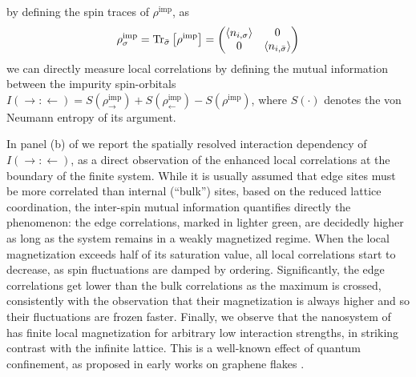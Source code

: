 \documentclass[edipack_sp.tex]{subfiles}
\begin{document}
by defining the spin traces of $\rho^\mathrm{imp}$, as
\begin{equation}
    \rho^\mathrm{imp}_\sigma = 
    {\rm Tr}_{\bar{\sigma}} \left[\rho^\mathrm{imp}\right] =
    \begin{pmatrix}
        \langle n_{i,\sigma} \rangle & 0 \\
        0 & \langle n_{i,\bar{\sigma}} \rangle
    \end{pmatrix}
\end{equation}
we can directly measure local correlations by defining the mutual information
between the impurity spin-orbitals
$I(\rightarrow:\leftarrow) = 
    S(\rho^\mathrm{imp}_{\rightarrow}) + 
    S(\rho^\mathrm{imp}_{\leftarrow}) -
    S(\rho^\mathrm{imp})$,
where $S(\cdot)$ denotes the von Neumann entropy of its argument.

In panel (b) of  we report the spatially resolved
interaction dependency of $I(\rightarrow:\leftarrow)$, as a direct 
observation of the enhanced local correlations at the boundary of the
finite system. While it is usually assumed that edge sites must be
more correlated than internal (``bulk'') sites, based on the reduced
lattice coordination, the inter-spin mutual information quantifies directly the phenomenon: the edge correlations,
marked in lighter green, are decidedly higher as long as the system 
remains in a weakly magnetized regime. When the local magnetization
exceeds half of its saturation value, all local correlations start to decrease,
as spin fluctuations are damped by ordering. Significantly, the edge 
correlations get lower than the bulk correlations as the maximum is 
crossed, consistently with the observation that their magnetization
is always higher and so their fluctuations are frozen faster.
Finally, we observe that the nanosystem of  has 
finite local magnetization for arbitrary low interaction strengths,
in striking contrast with the infinite lattice. This is a well-known
effect of quantum confinement, as proposed in early works on graphene
flakes \cite{Valli2016PRB,Valli2018NL}.



\ifSubfilesClassLoaded{
  
}{}
\end{document}
